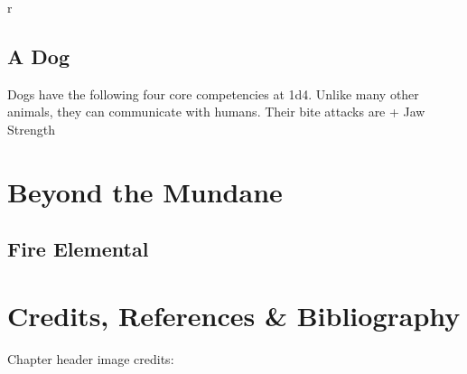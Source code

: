 \begin{wrapfigure}{r}{}
\end{wrapfigure}



\subsection{A Dog}
\label{subsec:dog}
Dogs have the following four core competencies at 1d4.
Unlike many other animals, they can communicate with humans.
Their bite attacks are  + Jaw Strength\\


\section{Beyond the Mundane}

\subsection{Fire Elemental}
\label{subsec:fire_elemental}

\section*{Credits, References \& Bibliography}

Chapter header image credits: \cite{squirrel_playing_chess}

\printbibliography[heading=none]
